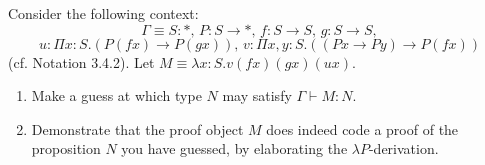 \begin{problem}{5.10}
    Consider the following context:
    $$\Gamma \equiv S : *, \, P : S \rightarrow *, \, f : S \rightarrow S, \, g : S \rightarrow S,$$
    $$u : \Pi x : S . (P(fx) \rightarrow P(gx)), \, v : \Pi x, y : S . ((Px \rightarrow Py) \rightarrow P(fx))$$
    (cf. Notation 3.4.2). Let $M \equiv \lambda x : S . v(fx)(gx)(ux)$.
    
    \begin{enumerate}[label=$(\alph*)$]
    \item Make a guess at which type $N$ may satisfy $\Gamma \vdash M : N$.
    \item Demonstrate that the proof object $M$ does indeed code a proof of the proposition $N$ you have guessed, by elaborating the $\lambda P$-derivation.
    \end{enumerate}
\end{problem}
